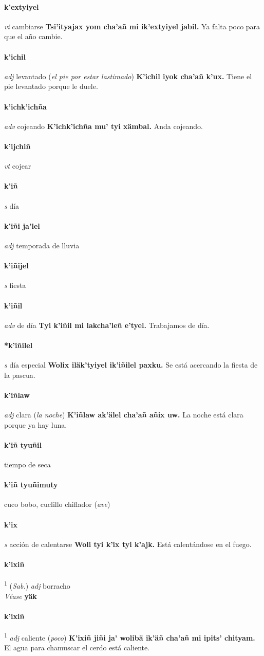 \documentclass{scrbook}
\newcommand{\entry}[1]{\paragraph{#1}}
\newcommand{\defsuperscript}[1]{\textsuperscript{1}}
\newcommand{\partofspeech}[1]{\textit{#1}}
\newcommand{\spanishtranslation}[1]{#1}
\newcommand{\clarification}[1]{(\textit{#1})}
\newcommand{\cholexample}[1]{\textbf{#1}}
\newcommand{\exampletranslation}[1]{#1}
\newcommand{\alsosee}[1]{\\\textit{Véase} \textbf{#1}}
\newcommand{\relevantdialect}[1]{(\textit{#1})}
\begin{document}
\begin{multicols}{2}
\entry{k'extyiyel}
\partofspeech{vi}
\spanishtranslation{cambiarse}
\cholexample{Tsi'ityajax yom cha'añ mi ik'extyiyel jabil.}
\exampletranslation{Ya falta poco para que el año cambie.}

\entry{k'ichil}
\partofspeech{adj}
\spanishtranslation{levantado}
\clarification{el pie por estar lastimado}
\cholexample{K'ichil iyok cha'añ k'ux.}
\exampletranslation{Tiene el pie levantado porque le duele.}

\entry{k'ichk'ichña}
\partofspeech{adv}
\spanishtranslation{cojeando}
\cholexample{K'ichk'ichña mu' tyi xämbal.}
\exampletranslation{Anda cojeando.}

\entry{k'ijchiñ}
\partofspeech{vt}
\spanishtranslation{cojear}

\entry{k'iñ}
\partofspeech{s}
\spanishtranslation{día}

\entry{k'iñi ja'lel}
\partofspeech{adj}
\spanishtranslation{temporada de lluvia}

\entry{k'iñijel}
\partofspeech{s}
\spanishtranslation{fiesta}

\entry{k'iñil}
\partofspeech{adv}
\spanishtranslation{de día}
\cholexample{Tyi k'iñil mi lakcha'leñ e'tyel.}
\exampletranslation{Trabajamos de día.}

\entry{*k'iñilel}
\partofspeech{s}
\spanishtranslation{día especial}
\cholexample{Wolix iläk'tyiyel ik'iñilel paxku.}
\exampletranslation{Se está acercando la fiesta de la pascua.}

\entry{k'iñlaw}
\partofspeech{adj}
\spanishtranslation{clara}
\clarification{la noche}
\cholexample{K'iñlaw ak'älel cha'añ añix uw.}
\exampletranslation{La noche está clara porque ya hay luna.}

\entry{k'iñ tyuñil}
\spanishtranslation{tiempo de seca}

\entry{k'iñ tyuñimuty}
\spanishtranslation{cuco bobo, cuclillo chiflador}
\clarification{ave}

\entry{k'ix}
\partofspeech{s}
\spanishtranslation{acción de calentarse}
\cholexample{Woli tyi k'ix tyi k'ajk.}
\exampletranslation{Está calentándose en el fuego.}

\entry{k'ixiñ}
\defsuperscript{1}
\relevantdialect{Sab.}
\partofspeech{adj}
\spanishtranslation{borracho}
\alsosee{yäk}

\entry{k'ixiñ}
\defsuperscript{2}
\partofspeech{adj}
\spanishtranslation{caliente}
\clarification{poco}
\cholexample{K'ixiñ jiñi ja' wolibä ik'äñ cha'añ mi ipits' chityam.}
\exampletranslation{El agua para chamuscar el cerdo está caliente.}


\end{multicols}
\end{document}
